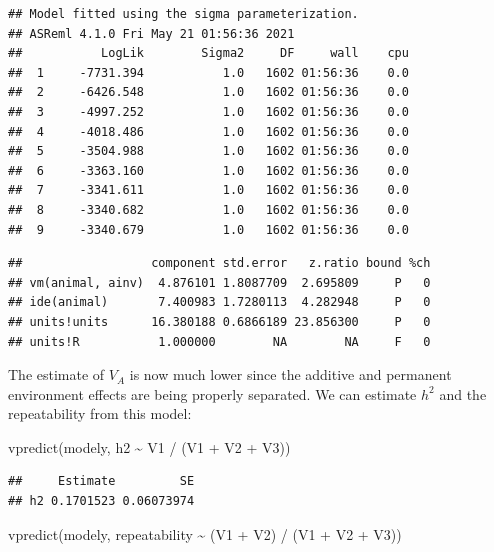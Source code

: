 \documentclass[
  12pt,
]{book}
\newenvironment{Shaded}{\begin{snugshade}}{\end{snugshade}}
\newcommand{\FunctionTok}[1]{\textcolor[rgb]{0.00,0.00,0.00}{#1}}
\newcommand{\NormalTok}[1]{#1}
\newcommand{\SpecialCharTok}[1]{\textcolor[rgb]{0.00,0.00,0.00}{#1}}
\begin{document}
\begin{verbatim}
## Model fitted using the sigma parameterization.
## ASReml 4.1.0 Fri May 21 01:56:36 2021
##           LogLik        Sigma2     DF     wall    cpu
##  1     -7731.394           1.0   1602 01:56:36    0.0
##  2     -6426.548           1.0   1602 01:56:36    0.0
##  3     -4997.252           1.0   1602 01:56:36    0.0
##  4     -4018.486           1.0   1602 01:56:36    0.0
##  5     -3504.988           1.0   1602 01:56:36    0.0
##  6     -3363.160           1.0   1602 01:56:36    0.0
##  7     -3341.611           1.0   1602 01:56:36    0.0
##  8     -3340.682           1.0   1602 01:56:36    0.0
##  9     -3340.679           1.0   1602 01:56:36    0.0
\end{verbatim}

\begin{Shaded}
\end{Shaded}

\begin{verbatim}
##                  component std.error   z.ratio bound %ch
## vm(animal, ainv)  4.876101 1.8087709  2.695809     P   0
## ide(animal)       7.400983 1.7280113  4.282948     P   0
## units!units      16.380188 0.6866189 23.856300     P   0
## units!R           1.000000        NA        NA     F   0
\end{verbatim}

The estimate of \(V_A\) is now much lower since the additive and permanent environment effects are being properly separated. We can estimate \(h^2\) and the repeatability from this model:

\begin{Shaded}
\begin{Highlighting}[]
\FunctionTok{vpredict}\NormalTok{(modely, h2 }\SpecialCharTok{\textasciitilde{}}\NormalTok{ V1 }\SpecialCharTok{/}\NormalTok{ (V1 }\SpecialCharTok{+}\NormalTok{ V2 }\SpecialCharTok{+}\NormalTok{ V3))}
\end{Highlighting}
\end{Shaded}

\begin{verbatim}
##     Estimate         SE
## h2 0.1701523 0.06073974
\end{verbatim}

\begin{Shaded}
\begin{Highlighting}[]
\FunctionTok{vpredict}\NormalTok{(modely, repeatability }\SpecialCharTok{\textasciitilde{}}\NormalTok{ (V1 }\SpecialCharTok{+}\NormalTok{ V2) }\SpecialCharTok{/}\NormalTok{ (V1 }\SpecialCharTok{+}\NormalTok{ V2 }\SpecialCharTok{+}\NormalTok{ V3))}
\end{Highlighting}
\end{Shaded}
\end{document}
